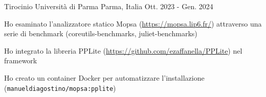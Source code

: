 

\begin{cventries}

  \cventry
    {Tirocinio} %
    {Università di Parma} %
    {Parma, Italia} %
    {Ott. 2023 - Gen. 2024} %
    {
      \begin{cvitems} %
				\item {Ho esaminato l'analizzatore statico Mopsa (\url{https://mopsa.lip6.fr/}) attraverso una serie di benchmark (coreutils-benchmarks, juliet-benchmarks)}
        \item {Ho integrato la libreria PPLite (\url{https://github.com/ezaffanella/PPLite}) nel framework}
        \item {Ho creato un container Docker per automatizzare l'installazione (\texttt{manueldiagostino/mopsa:pplite})}	
      \end{cvitems}
    }

\end{cventries}
